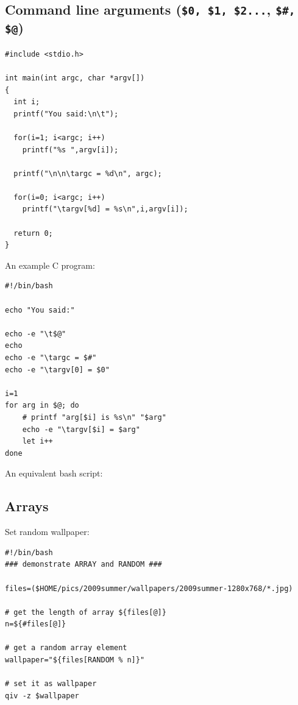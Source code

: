 \documentclass[12pt]{article}
\begin{document}
\subsection{Command line arguments (\texttt{\$0, \$1, \$2...}, \texttt{\$\#, \$@})}
\label{sec-3-5}

\begin{listing}[H]
\begin{verbatim}
#include <stdio.h>

int main(int argc, char *argv[])
{
  int i;
  printf("You said:\n\t");

  for(i=1; i<argc; i++)
    printf("%s ",argv[i]);

  printf("\n\n\targc = %d\n", argc);

  for(i=0; i<argc; i++)
    printf("\targv[%d] = %s\n",i,argv[i]);

  return 0;
}
\end{verbatim}
\caption{An example C program:}
\end{listing}

\begin{listing}[H]
\begin{verbatim}
#!/bin/bash

echo "You said:"

echo -e "\t$@"
echo
echo -e "\targc = $#"
echo -e "\targv[0] = $0"

i=1
for arg in $@; do
    # printf "arg[$i] is %s\n" "$arg"
    echo -e "\targv[$i] = $arg"
    let i++
done
\end{verbatim}
\caption{An equivalent bash script:}
\end{listing}

\subsection{Arrays}
\label{sec-3-6}
Set random wallpaper:
\begin{verbatim}
#!/bin/bash
### demonstrate ARRAY and RANDOM ###

files=($HOME/pics/2009summer/wallpapers/2009summer-1280x768/*.jpg)

# get the length of array ${files[@]}
n=${#files[@]}

# get a random array element
wallpaper="${files[RANDOM % n]}"

# set it as wallpaper
qiv -z $wallpaper
\end{verbatim}
\end{document}
